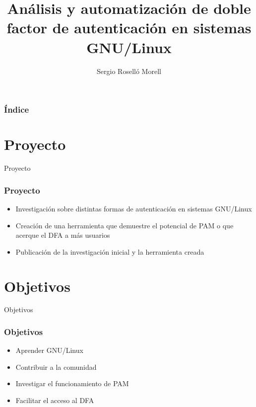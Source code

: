 \documentclass{beamer}
\title{Análisis y automatización de doble factor de autenticación en sistemas GNU/Linux}
\author{Sergio Roselló Morell}
\begin{document}
\beamertemplatenavigationsymbolsempty

\frame{\titlepage}

\begin{frame}
\frametitle{Índice}
\tableofcontents
\end{frame}
\section{Proyecto}
\begin{frame}{Proyecto}
	\frametitle{Proyecto}
	\begin{itemize}
		\item Investigación sobre distintas formas de autenticación en sistemas GNU/Linux
		\vspace{0.7cm}
		\item Creación de una herramienta que demuestre el potencial de PAM o que acerque el DFA a más usuarios
		\vspace{0.7cm}
		\item Publicación de la investigación inicial y la herramienta creada
	\end{itemize}
\end{frame}
\section{Objetivos}
\begin{frame}{Objetivos}
	\frametitle{Objetivos}
	{
	\begin{itemize}
		\item Aprender GNU/Linux
		\item Contribuir a la comunidad
		\item Investigar el funcionamiento de PAM
		\item Facilitar el acceso al DFA
	\end{itemize}
	\\}
\end{frame}
\end{document}

